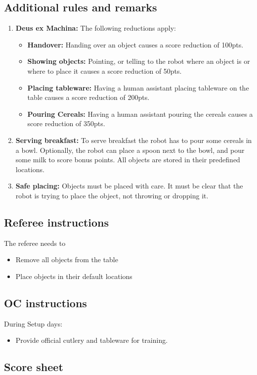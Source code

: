 \subsection*{Additional rules and remarks}
\begin{enumerate}[nosep]
	\item \textbf{Deus ex Machina:} The following reductions apply:
	\begin{itemize}[nosep]
		\item \textbf{Handover:} Handing over an object causes a score reduction of 100pts.
		\item \textbf{Showing objects:} Pointing, or telling to the robot where an object is or where to place it causes a score reduction of 50pts.
		\item \textbf{Placing tableware:} Having a human assistant placing tableware on the table causes a score reduction of 200pts.
		\item \textbf{Pouring Cereals:} Having a human assistant pouring the cereals causes a score reduction of 350pts.
	\end{itemize}

	\item \textbf{Serving breakfast:} To serve breakfast the robot has to pour some cereals in a bowl.
	Optionally, the robot can place a spoon next to the bowl, and pour some milk to score bonus points.
	All objects are stored in their predefined locations.

	\item \textbf{Safe placing:} Objects must be placed with care. It must be clear that the robot is trying to place the object, not throwing or dropping it.

\end{enumerate}

\subsection*{Referee instructions}

The referee needs to
\begin{itemize}
	\item Remove all objects from the table
	\item Place objects in their default locations
\end{itemize}

\subsection*{OC instructions}
During Setup days:
\begin{itemize}
	\item Provide official cutlery and tableware for training.
\end{itemize}


\subsection*{Score sheet}



